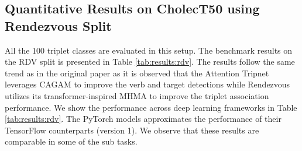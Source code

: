 \documentclass{article}
\begin{document}
{\begin{table}[ht]
\centering
    \setlength{\tabcolsep}{9pt}
    \captionsetup{skip=0pt,singlelinecheck=off,justification=raggedright}
    \caption{Benchmark triplet recognition AP (\%) on CholecT50 dataset for different frameworks using RDV split.}
    \label{tab:results:rdv}
\end{table}


 
\subsection{Quantitative Results on CholecT50 using Rendezvous Split}
All the 100 triplet classes are evaluated in this setup.
The benchmark results on the RDV split is presented in Table \ref{tab:results:rdv}. The results follow the same trend as in the original paper \cite{nwoye2021rendezvous} as it is observed that the Attention Tripnet leverages CAGAM to improve the verb and target detections while Rendezvous utilizes its transformer-inspired MHMA to improve the triplet association performance.
We show the performance across deep learning frameworks in Table \ref{tab:results:rdv}. The PyTorch models approximates the performance of their TensorFlow counterparts (version 1). We observe that these results are comparable in some of the sub tasks.










}
\end{document}

